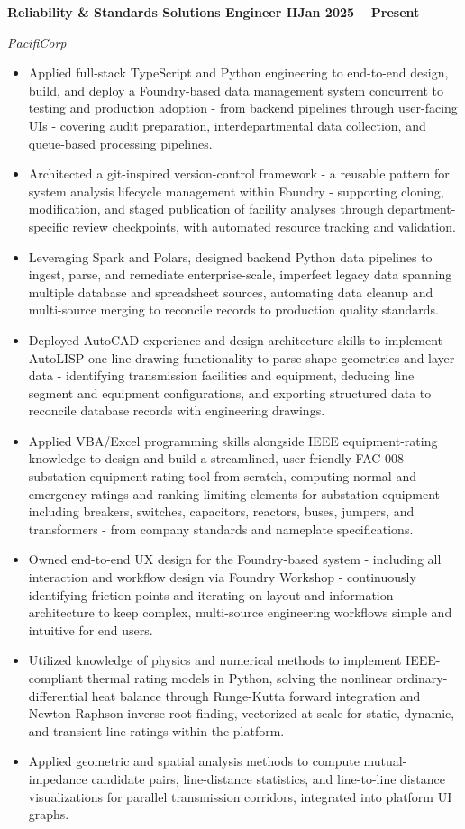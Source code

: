 \documentclass[10pt, letterpaper]{article}
\newcommand{\jobline}[2]{%
  \vspace{5pt}%
  \noindent\textbf{#1}\hfill\textbf{#2}\par%
  \vspace{1pt}%
}
\newcommand{\subline}[1]{%
  \vspace{-1pt}%
  \noindent\textit{#1}\par%
  \vspace{1pt}%
}
\newenvironment{rlist}{%
  \begin{itemize}[leftmargin=1.4em, itemsep=1pt, topsep=2pt, parsep=0pt]%
}{%
  \end{itemize}%
}
\begin{document}
\jobline{Reliability \& Standards Solutions Engineer II}{Jan 2025 -- Present}
\subline{PacifiCorp}
\begin{rlist}
  \item Applied full-stack TypeScript and Python engineering to end-to-end design, build, and deploy a Foundry-based data management system concurrent to testing and production adoption - from backend pipelines through user-facing UIs - covering audit preparation, interdepartmental data collection, and queue-based processing pipelines.
  \item Architected a git-inspired version-control framework - a reusable pattern for system analysis lifecycle management within Foundry - supporting cloning, modification, and staged publication of facility analyses through department-specific review checkpoints, with automated resource tracking and validation.
  \item Leveraging Spark and Polars, designed backend Python data pipelines to ingest, parse, and remediate enterprise-scale, imperfect legacy data spanning multiple database and spreadsheet sources, automating data cleanup and multi-source merging to reconcile records to production quality standards.
  \item Deployed AutoCAD experience and design architecture skills to implement AutoLISP one-line-drawing functionality to parse shape geometries and layer data - identifying transmission facilities and equipment, deducing line segment and equipment configurations, and exporting structured data to reconcile database records with engineering drawings.
  \item Applied VBA/Excel programming skills alongside IEEE equipment-rating knowledge to design and build a streamlined, user-friendly FAC-008 substation equipment rating tool from scratch, computing normal and emergency ratings and ranking limiting elements for substation equipment - including breakers, switches, capacitors, reactors, buses, jumpers, and transformers - from company standards and nameplate specifications.
  \item Owned end-to-end UX design for the Foundry-based system - including all interaction and workflow design via Foundry Workshop - continuously identifying friction points and iterating on layout and information architecture to keep complex, multi-source engineering workflows simple and intuitive for end users.
  \item Utilized knowledge of physics and numerical methods to implement IEEE-compliant thermal rating models in Python, solving the nonlinear ordinary-differential heat balance through Runge-Kutta forward integration and Newton-Raphson inverse root-finding, vectorized at scale for static, dynamic, and transient line ratings within the platform.
  \item Applied geometric and spatial analysis methods to compute mutual-impedance candidate pairs, line-distance statistics, and line-to-line distance visualizations for parallel transmission corridors, integrated into platform UI graphs.
\end{rlist}
\end{document}
